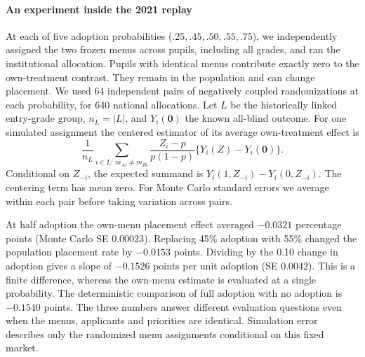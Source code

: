 \paragraph{An experiment inside the 2021 replay}
At each of five adoption probabilities ($.25,.45,.50,.55,.75$), we independently assigned the two frozen menus across pupils, including all grades, and ran the institutional allocation. Pupils with identical menus contribute exactly zero to the own-treatment contrast. They remain in the population and can change placement. We used 64 independent pairs of negatively coupled randomizations at each probability, for 640 national allocations. Let $L$ be the historically linked entry-grade group, $n_L=|L|$, and $Y_i(\mathbf 0)$ the known all-blind outcome. For one simulated assignment the centered estimator of its average own-treatment effect is
\[
 \frac{1}{n_L}\sum_{i\in L:\,m_{Ai}\ne m_{Bi}}
 \frac{Z_i-p}{p(1-p)}\{Y_i(Z)-Y_i(\mathbf 0)\}.
\]
Conditional on $Z_{-i}$, the expected summand is $Y_i(1,Z_{-i})-Y_i(0,Z_{-i})$. The centering term has mean zero. For Monte Carlo standard errors we average within each pair before taking variation across pairs.

At half adoption the own-menu placement effect averaged $-0.0321$ percentage points (Monte Carlo SE $0.00023$). Replacing 45\% adoption with 55\% changed the population placement rate by $-0.0153$ points. Dividing by the 0.10 change in adoption gives a slope of $-0.1526$ points per unit adoption (SE $0.0042$). This is a finite difference, whereas the own-menu estimate is evaluated at a single probability. The deterministic comparison of full adoption with no adoption is $-0.1540$ points. The three numbers answer different evaluation questions even when the menus, applicants and priorities are identical. Simulation error describes only the randomized menu assignments conditional on this fixed market.
